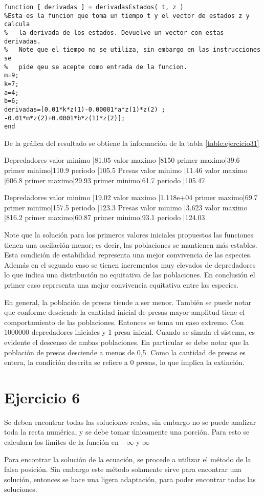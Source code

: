 \documentclass {article}
\begin{document}
\begin{lstlisting}
function [ derivadas ] = derivadasEstados( t, z )
%Esta es la funcion que toma un tiempo t y el vector de estados z y calcula
%   la derivada de los estados. Devuelve un vector con estas derivadas.
%   Note que el tiempo no se utiliza, sin embargo en las instrucciones se
%   pide qeu se acepte como entrada de la funcion.
m=9;
k=7;
a=4;
b=6;
derivadas=[0.01*k*z(1)-0.00001*a*z(1)*z(2) ; -0.01*m*z(2)+0.0001*b*z(1)*z(2)];
end
\end{lstlisting}


De la gráfica del resultado se obtiene la información de la tabla \ref{table:ejercicio31}

Depredadores
valor minimo |81.05
valor maximo |8150
primer maximo|39.6
primer minimo|110.9
periodo      |105.5
Presas
valor minimo |11.46
valor maximo |606.8
primer maximo|29.93
primer minimo|61.7
periodo      |105.47


Depredadores
valor minimo |19.02
valor maximo |1.118e+04
primer maximo|69.7
primer minimo|157.5
periodo      |123.3
Presas
valor minimo |3.623
valor maximo |816.2
primer maximo|60.87
primer minimo|93.1
periodo      |124.03


Note que la solución para los primeros valores iniciales propuestos las funciones tienen una oscilación menor; es decir, las poblaciones se mantienen más estables. Esta condición de estabilidad representa una mejor convivencia de las especies. Además en el segundo caso se tienen incrementos muy elevados de depredadores lo que indica una distribución no equitativa de las poblaciones. En conclusión el primer caso representa una mejor convivencia equitativa entre las especies.

En general, la población de presas tiende a ser menor. También se puede notar que conforme desciende la cantidad inicial de presas mayor amplitud tiene el comportamiento de las poblaciones. Entonces se toma un caso extremo. Con 1000000 depredadores iniciales y 1 presa inicial. Cuando se simula el sistema, es evidente el descenso de ambas poblaciones. En particular se debe notar que la población de presas desciende a menos de 0,5. Como la cantidad de presas es entera, la condición descrita se refiere a 0 presas, lo que implica la extinción. 

\section{Ejercicio 6}

Se deben encontrar todas las soluciones reales, sin embargo no se puede analizar toda la recta numérica, y se debe tomar únicamente una porción. Para esto se calcularn los límites de la función en $-\infty$ y $\infty$

Para encontrar la solución de la ecuación, se procede a utilizar el método de la falsa posición. Sin embargo este método solamente sirve para encontrar una solución, entonces se hace una ligera adaptación, para poder encontrar todas las soluciones. 
\end{document}
